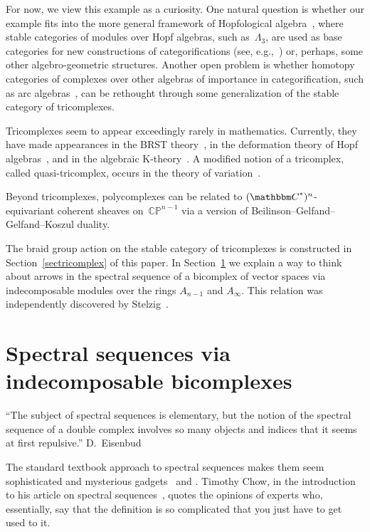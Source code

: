 \documentclass[pdftex]{sigma}
\theoremstyle{definition}
\numberwithin{equation}{section}
\def\C{{\mathbbm C}}
\begin{document}
For now, we view this example as a curiosity. One natural question is whether our example fits into the more general framework of Hopfological algebra~\cite{Kh3,Q}, where stable categories of modules over Hopf algebras, such as~$\Lambda_3$, are used as base categories for new constructions of categorifications (see, e.g.,~\cite{KQ}) or, perhaps, some other algebro-geometric structures. Another open problem is whether homotopy categories of complexes over other algebras of importance in categorification, such as arc algebras~\cite{Kh2}, can be rethought through some generalization of the stable category of tricomplexes.

Tricomplexes seem to appear exceedingly rarely in mathematics. Currently, they have made appearances in the BRST theory~\cite{Sh}, in the deformation theory of Hopf algebras~\cite{Y}, and in the algebraic K-theory~\cite{Ca}. A modified notion of a tricomplex, called quasi-tricomplex, occurs in the theory of variation~\cite{O}.

Beyond tricomplexes, polycomplexes can be related to $(\C^{\ast})^n$-equivariant coherent sheaves on~$\mathbb{CP}^{n-1}$ via a version of Beilinson--Gelfand--Gelfand--Koszul duality.

The braid group action on the stable category of tricomplexes is constructed in Section~\ref{sectricomplex} of this paper. In Section~\ref{secbicomplex} we explain a way to think about arrows in the spectral sequence of a bicomplex of vector spaces via indecomposable modules over the rings $A_{n-1}$ and $A_{\infty}$. This relation was independently discovered by Stelzig~\cite{St-2018}.

\section{Spectral sequences via indecomposable bicomplexes} \label{secbicomplex}

\begin{flushright}
\parbox{3.5in}{\small ``The subject of spectral sequences is elementary,
 but the notion of the spectral sequence of a double complex involves so many
objects and indices that it seems at first repulsive.'' D.~Eisenbud~\cite[Appendix 3.13]{Eisenbud}}
\end{flushright}

The standard textbook approach to spectral sequences makes them seem sophisticated and mysterious gadgets~\cite{CE, GM, McCleary,Weibel, W} and \cite[Appendix 3.13]{Eisenbud}.
Timothy Chow, in the introduction to his article on spectral sequences~\cite{Chow},
quotes the opinions of experts who, essentially, say that the definition is so complicated that you just have to get used to it.
\end{document}
